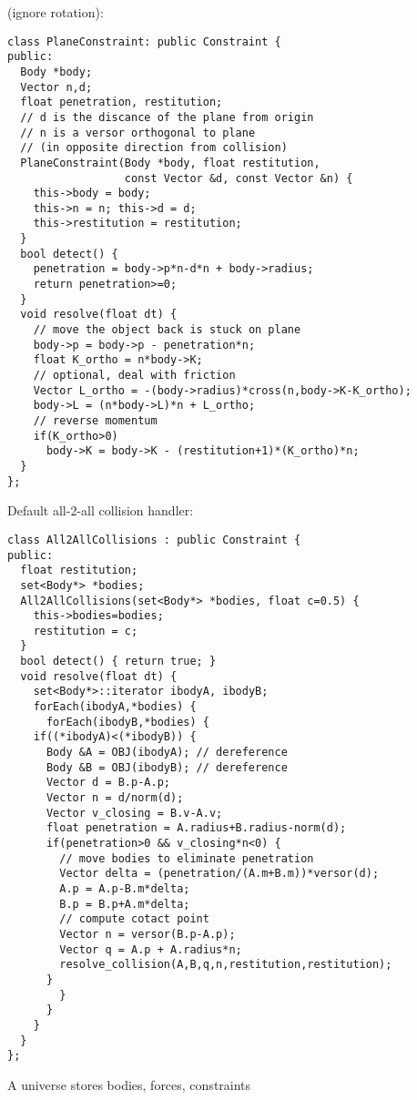 (ignore rotation): \begin{lstlisting}
class PlaneConstraint: public Constraint {
public:
  Body *body;
  Vector n,d;
  float penetration, restitution;
  // d is the discance of the plane from origin
  // n is a versor orthogonal to plane
  // (in opposite direction from collision)
  PlaneConstraint(Body *body, float restitution,
                  const Vector &d, const Vector &n) {
    this->body = body;
    this->n = n; this->d = d;
    this->restitution = restitution;
  }
  bool detect() {
    penetration = body->p*n-d*n + body->radius;
    return penetration>=0;
  }
  void resolve(float dt) {
    // move the object back is stuck on plane
    body->p = body->p - penetration*n;
    float K_ortho = n*body->K;
    // optional, deal with friction
    Vector L_ortho = -(body->radius)*cross(n,body->K-K_ortho);
    body->L = (n*body->L)*n + L_ortho;
    // reverse momentum
    if(K_ortho>0)
      body->K = body->K - (restitution+1)*(K_ortho)*n;
  }
};
\end{lstlisting}
\noindent
Default all-2-all collision handler: \begin{lstlisting}
class All2AllCollisions : public Constraint {
public:
  float restitution;
  set<Body*> *bodies;
  All2AllCollisions(set<Body*> *bodies, float c=0.5) {
    this->bodies=bodies;
    restitution = c;
  }
  bool detect() { return true; }
  void resolve(float dt) {
    set<Body*>::iterator ibodyA, ibodyB;
    forEach(ibodyA,*bodies) {
      forEach(ibodyB,*bodies) {
	if((*ibodyA)<(*ibodyB)) {
	  Body &A = OBJ(ibodyA); // dereference
	  Body &B = OBJ(ibodyB); // dereference
	  Vector d = B.p-A.p;
	  Vector n = d/norm(d);
	  Vector v_closing = B.v-A.v;
	  float penetration = A.radius+B.radius-norm(d);
	  if(penetration>0 && v_closing*n<0) {
	    // move bodies to eliminate penetration
	    Vector delta = (penetration/(A.m+B.m))*versor(d);
	    A.p = A.p-B.m*delta;
	    B.p = B.p+A.m*delta;
	    // compute cotact point
	    Vector n = versor(B.p-A.p);
	    Vector q = A.p + A.radius*n;
	    resolve_collision(A,B,q,n,restitution,restitution);
	  }
        }
      }
    }
  }
};
\end{lstlisting}
\noindent
A universe stores bodies, forces, constraints
